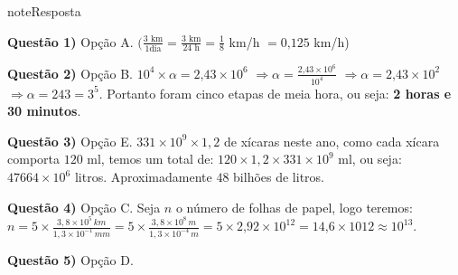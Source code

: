 \begin{sphinxadmonition}{note}{Resposta}

\textbf{Questão 1)} Opção A.  \((\frac{3\text{ km}}{1\text{dia}}=\frac{3\text{ km}}{24\text{ h}}=\frac{1}{8}\) km/h \(=0\text{,}125\) km/h)

\textbf{Questão 2)} Opção B. \(10^{4} \times \alpha = 2\text{,}43 \times 10^{6}\) \(\Rightarrow \alpha = \frac{2\text{,}43 \times 10^{6}}{10^{4}}\) \(\Rightarrow \alpha = 2\text{,}43 \times 10^{2}\) \(\Rightarrow \alpha = 243 = 3^{5}\). Portanto foram cinco etapas de meia hora, ou seja: \textbf{2 horas e 30 minutos}.

\textbf{Questão 3)} Opção E. \(331 \times 10^{9} \times 1,2\) de xícaras neste ano, como cada xícara comporta \(120\) ml, temos um total de: \(120 \times 1,2 \times 331 \times 10^{9}\) ml, ou seja: \(47664 \times 10^{6}\) litros. Aproximadamente \(48\) bilhões de litros.

\textbf{Questão 4)} Opção C. Seja \(n\) o número de folhas de papel, logo teremos: \(n = 5 \times \frac{3,8 \times 10^{5}\, km}{1,3 \times 10^{-1}\,mm} = 5 \times \frac{3,8 \times 10^{8}\, m}{1,3 \times 10^{-4}\,m}= 5 \times 2\text{,}92 \times 10^{12} = 14\text{,}6 \times 10{12} \approx 10^{13}.\)

\textbf{Questão 5)} Opção D.
\end{sphinxadmonition}
